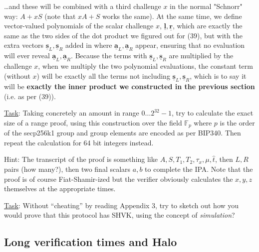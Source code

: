 \documentclass[10pt,a4paper]{article}
\begin{document}
\ldots and these will be combined with a third challenge $x$ in the normal "Schnorr" way: $A + xS$ (note that $xA + S$ works the same). At the same time, we define vector-valued polynomials of the scalar challenge $x$, $\underline{\textbf{l}}, \underline{\textbf{r}}$, which are exactly the same as the two sides of the dot product we figured out for (39), but with the extra vectors $\underline{\textbf{s}}_L, \underline{\textbf{s}}_R$ added in where $\underline{\textbf{a}}_L, \underline{\textbf{a}}_R$ appear, ensuring that no evaluation will ever reveal $\underline{\textbf{a}}_L, \underline{\textbf{a}}_R$. Because the terms with $\underline{\textbf{s}}_L, \underline{\textbf{s}}_R$ are multiplied by the challenge $x$, when we multiply the two polynomial evaluations, the constant term (without $x$) will be exactly all the terms not including $\underline{\textbf{s}}_L, \underline{\textbf{s}}_R$, which is to say it will be \textbf{exactly the inner product we constructed in the previous section} (i.e. as per (39)).
\fi


\vspace{5 pt} 

\begin{framed}
\underline{Task}: Taking concretely an amount in range $0 \ldots 2^{32}-1$, try to calculate the exact size of a range proof, using this construction over the field $\mathbb{F}_p$ where $p$ is the order of the secp256k1 group and group elements are encoded as per BIP340. Then repeat the calculation for 64 bit integers instead.

\vspace{5 pt}
Hint: The transcript of the proof is something like $A, S, T_1, T_2, \tau_x, \mu, \hat{t}$, then $L, R$ pairs (how many?), then two final scalars $a, b$ to complete the IPA. Note that the proof is of course Fiat-Shamir-ized but the verifier obviously calculates the $x, y, z$ themselves at the appropriate times.
\end{framed}


\begin{framed}
\underline{Task}: Without ``cheating'' by reading Appendix 3, try to sketch out how you would prove that this protocol has SHVK, using the concept of \emph{simulation}?
\end{framed}


\subsection{Long verification times and Halo}
\end{document}
